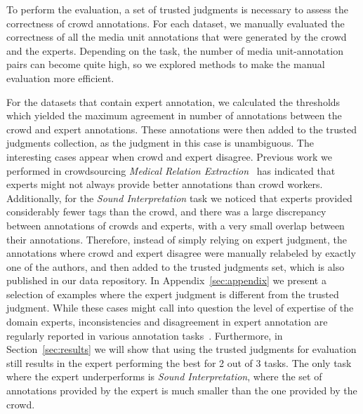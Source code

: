To perform the evaluation, a set of trusted judgments is necessary to assess the correctness of crowd annotations. For each dataset, we manually evaluated the correctness of all the media unit annotations that were generated by the crowd and the experts. Depending on the task, the number of media unit-annotation pairs can become quite high, so we explored methods to make the manual evaluation more efficient.

For the datasets that contain expert annotation, we calculated the thresholds which yielded the maximum agreement in number of annotations between the crowd and expert annotations.  These annotations were then added to the trusted judgments collection, as the judgment in this case is unambiguous.  The interesting cases appear when crowd and expert disagree.  Previous work we performed in crowdsourcing \textit{Medical Relation Extraction}~\cite{aroyo2015truth} has indicated that experts might not always provide better annotations than crowd workers.  Additionally, for the \textit{Sound Interpretation} task we noticed that experts provided considerably fewer tags than the crowd, and there was a large discrepancy between annotations of crowds and experts, with a very small overlap between their annotations.  Therefore, instead of simply relying on expert judgment, the annotations where crowd and expert disagree were manually relabeled by exactly one of the authors, and then added to the trusted judgments set, which is also published in our data repository. In Appendix~\ref{sec:appendix} we present a selection of examples where the expert judgment is different from the trusted judgment. While these cases might call into question the level of expertise of the domain experts, inconsistencies and disagreement in expert annotation are regularly reported in various annotation tasks~\cite{cheatham2014conference,mcdonnell2016relevant,INEL16.635}.  Furthermore, in Section~\ref{sec:results} we will show that using the trusted judgments for evaluation still results in the expert performing the best for 2 out of 3 tasks. The only task where the expert underperforms is \textit{Sound Interpretation}, where the set of annotations provided by the expert is much smaller than the one provided by the crowd.


